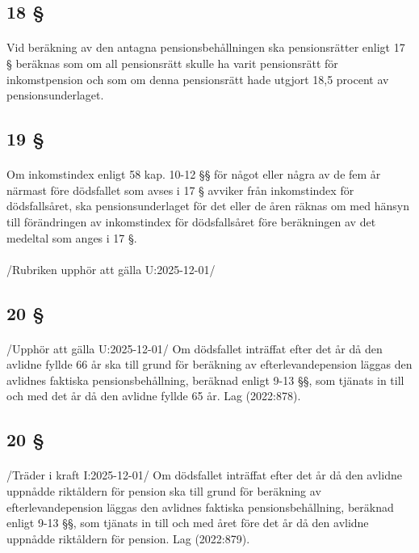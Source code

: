 \documentclass[a4paper,notitlepage,openany,10pt]{book}
\begin{document}
\subsection*{18 §}
\paragraph*{}
Vid beräkning av den antagna pensionsbehållningen ska pensionsrätter enligt 17 § beräknas som om all pensionsrätt skulle ha varit pensionsrätt för inkomstpension och som om denna pensionsrätt hade utgjort 18,5 procent av pensionsunderlaget.
\subsection*{19 §}
\paragraph*{}
Om inkomstindex enligt 58 kap. 10-12 §§ för något eller några av de fem år närmast före dödsfallet som avses i 17 § avviker från inkomstindex för dödsfallsåret, ska pensionsunderlaget för det eller de åren räknas om med hänsyn till förändringen av inkomstindex för dödsfallsåret före beräkningen av det medeltal som anges i 17 §.
\paragraph*{}
/Rubriken upphör att gälla U:2025-12-01/
\subsection*{20 §}
\paragraph*{}
/Upphör att gälla U:2025-12-01/
Om dödsfallet inträffat efter det år då den avlidne fyllde 66 år ska till grund för beräkning av efterlevandepension läggas den avlidnes faktiska pensionsbehållning, beräknad enligt 9-13 §§, som tjänats in till och med det år då den avlidne fyllde 65 år.
Lag (2022:878).
\subsection*{20 §}
\paragraph*{}
/Träder i kraft I:2025-12-01/
Om dödsfallet inträffat efter det år då den avlidne uppnådde riktåldern för pension ska till grund för beräkning av efterlevandepension läggas den avlidnes faktiska pensionsbehållning, beräknad enligt 9-13 §§, som tjänats in till och med året före det år då den avlidne uppnådde riktåldern för pension.
Lag (2022:879).
\end{document}
